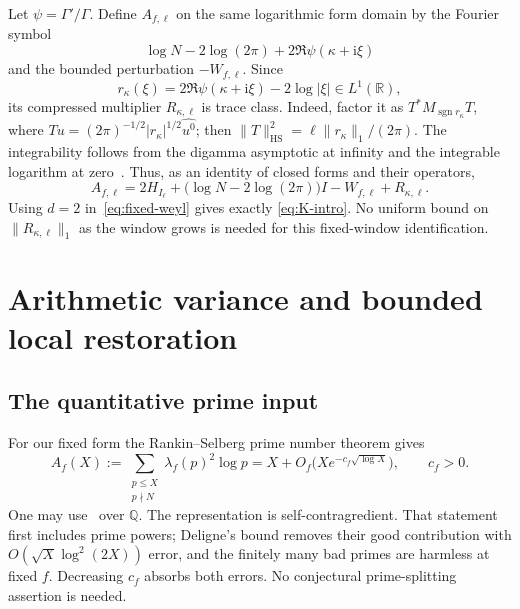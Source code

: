 \documentclass[11pt,reqno]{amsart}
\numberwithin{equation}{section}
\newcommand{\R}{\mathbb R}
\newcommand{\ii}{\mathrm i}
\newcommand{\norm}[1]{\lVert#1\rVert}
\newcommand{\abs}[1]{\lvert#1\rvert}
\begin{document}
Let $\psi=\Gamma'/\Gamma$. Define $A_{f,\ell}$ on the same
logarithmic form domain by the Fourier symbol
\[
 \log N-2\log(2\pi)+2\Re\psi(\kappa+\ii\xi)
\]
and the bounded perturbation $-W_{f,\ell}$. Since
\[
 r_\kappa(\xi)=2\Re\psi(\kappa+\ii\xi)-2\log\abs\xi
       \in L^1(\R),
\]
its compressed multiplier $R_{\kappa,\ell}$ is trace class.
Indeed, factor it as $T^*M_{\operatorname{sgn}r_\kappa}T$,
where $Tu=(2\pi)^{-1/2}\abs{r_\kappa}^{1/2}\widehat{u^0}$;
then $\norm T_{\mathrm{HS}}^2=\ell\norm{r_\kappa}_1/(2\pi)$.
The integrability follows from the digamma asymptotic at infinity
and the integrable logarithm at zero~\cite{DLMF}. Thus, as an
identity of closed forms and their operators,
\begin{equation}\label{eq:gamma-identity}
 A_{f,\ell}=2H_{I_\ell}
       +\bigl(\log N-2\log(2\pi)\bigr)I
       -W_{f,\ell}+R_{\kappa,\ell}.
\end{equation}
Using $d=2$ in~\eqref{eq:fixed-weyl} gives exactly
\eqref{eq:K-intro}. No uniform bound on
$\norm{R_{\kappa,\ell}}_1$ as the window grows is needed for
this fixed-window identification.

\section{Arithmetic variance and bounded local restoration}\label{sec:arithmetic}

\subsection*{The quantitative prime input}

For our fixed form the Rankin--Selberg prime number theorem gives
\begin{equation}\label{eq:RS}
 A_f(X):=\sum_{\substack{p\le X\\p\nmid N}}
              \lambda_f(p)^2\log p
       =X+O_f\bigl(Xe^{-c_f\sqrt{\log X}}\bigr),\qquad c_f>0.
\end{equation}
One may use~\cite[Lemma 3.2]{GJ} over $\mathbb Q$. The representation
is self-contragredient. That statement first includes prime powers;
Deligne's bound removes their good contribution with
$O(\sqrt X\log^2(2X))$ error, and the finitely many bad primes
are harmless at fixed $f$. Decreasing $c_f$ absorbs both errors.
No conjectural prime-splitting assertion is needed.
\end{document}
